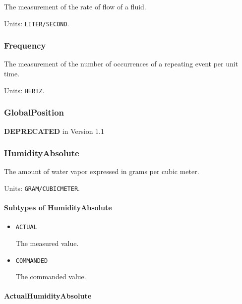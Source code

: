 The measurement of the rate of flow of a fluid.


Units: \texttt{LITER/SECOND}.

\subsubsection{Frequency}
\label{sec:Frequency}



The measurement of the number of occurrences of a repeating event per unit time.


Units: \texttt{HERTZ}.

\subsubsection{GlobalPosition}
\label{sec:GlobalPosition}



\textbf{DEPRECATED} in Version 1.1


\subsubsection{HumidityAbsolute}
\label{sec:HumidityAbsolute}



The amount of water vapor expressed in grams per cubic meter.


Units: \texttt{GRAM/CUBIC\textunderscore METER}.

\paragraph{Subtypes of HumidityAbsolute}\mbox{}
\label{sec:Subtypes of HumidityAbsolute}

\begin{itemize}

\item \texttt{ACTUAL}


The measured value.

\item \texttt{COMMANDED}


The commanded value.


\end{itemize}

\paragraph{ActualHumidityAbsolute}\mbox{}
\label{sec:ActualHumidityAbsolute}


